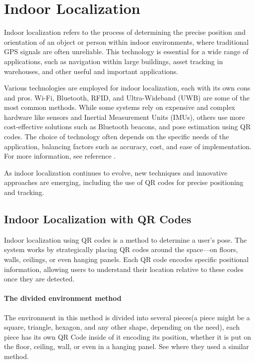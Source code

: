 \section{Indoor Localization}

Indoor localization refers to the process of determining the precise position and orientation of an object or person within indoor environments, where traditional GPS signals are often unreliable. This technology is essential for a wide range of applications, such as navigation within large buildings, asset tracking in warehouses, and other useful and important applications.

Various technologies are employed for indoor localization, each with its own cons and pros. Wi-Fi, Bluetooth, RFID, and Ultra-Wideband (UWB) are some of the most common methods. While some systems rely on expensive and complex hardware like sensors and Inertial Measurement Units (IMUs), others use more cost-effective solutions such as Bluetooth beacons, and pose estimation using QR codes. The choice of technology often depends on the specific needs of the application, balancing factors such as accuracy, cost, and ease of implementation. For more information, see reference \cite{leitch2023}.

As indoor localization continues to evolve, new techniques and innovative approaches are emerging, including the use of QR codes for precise positioning and tracking. 

\subsection{Indoor Localization with QR Codes}

Indoor localization using QR codes is a method to determine a user’s pose. The system works by strategically placing QR codes around the space—on floors, walls, ceilings, or even hanging panels. Each QR code encodes specific positional information, allowing users to understand their location relative to these codes once they are detected.

\paragraph{The divided environment method}

The environment in this method is divided into several pieces(a piece might be a square, triangle, hexagon, and any other shape, depending on the need), each piece has its own QR Code inside of it encoding its position, whether it is put on the floor, ceiling, wall, or even in a hanging panel. See \cite{zhang2015} where they used a similar method.

